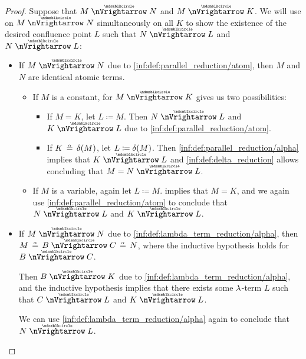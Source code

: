 \begin{proof}
   Suppose that \( M \ppred N \) and \( M \ppred K \). We will use  on \( M \ppred N \) simultaneously on all \( K \) to show the existence of the desired confluence point \( L \) such that \( N \ppred L \) and \( N \ppred L \):
  \begin{itemize}
    \item If \( M \ppred N \) due to \ref{inf:def:parallel_reduction/atom}, then \( M \) and \( N \) are identical atomic terms.

    \begin{itemize}
      \item If \( M \) is a constant,  for \( M \ppred K \) gives us two possibilities:
      \begin{itemize}
        \item If \( M = K \), let \( L \coloneqq M \). Then \( N \ppred L \) and \( K \ppred L \) due to \ref{inf:def:parallel_reduction/atom}.

        \item If \( K \aequiv \op*{\delta}(M) \), let \( L \coloneqq \op*{\delta}(M) \). Then \ref{inf:def:parallel_reduction/alpha} implies that \( K \ppred L \) and \ref{inf:def:delta_reduction} allows concluding that \( M = N \ppred L \).
      \end{itemize}

      \item If \( M \) is a variable, again let \( L \coloneqq M \).  implies that \( M = K \), and we again use \ref{inf:def:parallel_reduction/atom} to conclude that \( N \ppred L \) and \( K \ppred L \).
    \end{itemize}

    \item If \( M \ppred N \) due to \ref{inf:def:lambda_term_reduction/alpha}, then \( M \aequiv B \ppred C \aequiv N \), where the inductive hypothesis holds for \( B \ppred C \).

    Then \( B \ppred K \) due to \ref{inf:def:lambda_term_reduction/alpha}, and the inductive hypothesis implies that there exists some \( \mathrm{\lambda} \)-term \( L \) such that \( C \ppred L \) and \( K \ppred L \).

    We can use \ref{inf:def:lambda_term_reduction/alpha} again to conclude that \( N \ppred L \).


\end{itemize}
\end{proof}
